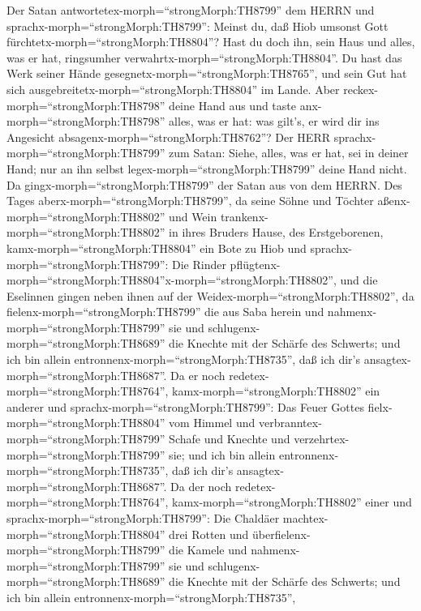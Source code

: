  Der Satan antwortetex-morph=``strongMorph:TH8799'' dem
HERRN und sprachx-morph=``strongMorph:TH8799'': Meinst du, daß Hiob
umsonst Gott fürchtetx-morph=``strongMorph:TH8804''?  Hast
du doch ihn, sein Haus und alles, was er hat, ringsumher
verwahrtx-morph=``strongMorph:TH8804''. Du hast das Werk seiner Hände
gesegnetx-morph=``strongMorph:TH8765'', und sein Gut hat sich
ausgebreitetx-morph=``strongMorph:TH8804'' im Lande.  Aber
reckex-morph=``strongMorph:TH8798'' deine Hand aus und taste
anx-morph=``strongMorph:TH8798'' alles, was er hat: was gilt's, er wird
dir ins Angesicht absagenx-morph=``strongMorph:TH8762''? 
Der HERR sprachx-morph=``strongMorph:TH8799'' zum Satan: Siehe, alles,
was er hat, sei in deiner Hand; nur an ihn selbst
legex-morph=``strongMorph:TH8799'' deine Hand nicht. Da
gingx-morph=``strongMorph:TH8799'' der Satan aus von dem HERRN.
 Des Tages aberx-morph=``strongMorph:TH8799'', da seine
Söhne und Töchter aßenx-morph=``strongMorph:TH8802'' und Wein
trankenx-morph=``strongMorph:TH8802'' in ihres Bruders Hause, des
Erstgeborenen,  kamx-morph=``strongMorph:TH8804'' ein Bote
zu Hiob und sprachx-morph=``strongMorph:TH8799'': Die Rinder
pflügtenx-morph=``strongMorph:TH8804''x-morph=``strongMorph:TH8802'',
und die Eselinnen gingen neben ihnen auf der
Weidex-morph=``strongMorph:TH8802'',  da
fielenx-morph=``strongMorph:TH8799'' die aus Saba herein und
nahmenx-morph=``strongMorph:TH8799'' sie und
schlugenx-morph=``strongMorph:TH8689'' die Knechte mit der Schärfe des
Schwerts; und ich bin allein entronnenx-morph=``strongMorph:TH8735'',
daß ich dir's ansagtex-morph=``strongMorph:TH8687''.  Da er
noch redetex-morph=``strongMorph:TH8764'',
kamx-morph=``strongMorph:TH8802'' ein anderer und
sprachx-morph=``strongMorph:TH8799'': Das Feuer Gottes
fielx-morph=``strongMorph:TH8804'' vom Himmel und
verbranntex-morph=``strongMorph:TH8799'' Schafe und Knechte und
verzehrtex-morph=``strongMorph:TH8799'' sie; und ich bin allein
entronnenx-morph=``strongMorph:TH8735'', daß ich dir's
ansagtex-morph=``strongMorph:TH8687''.  Da der noch
redetex-morph=``strongMorph:TH8764'', kamx-morph=``strongMorph:TH8802''
einer und sprachx-morph=``strongMorph:TH8799'': Die Chaldäer
machtex-morph=``strongMorph:TH8804'' drei Rotten und
überfielenx-morph=``strongMorph:TH8799'' die Kamele und
nahmenx-morph=``strongMorph:TH8799'' sie und
schlugenx-morph=``strongMorph:TH8689'' die Knechte mit der Schärfe des
Schwerts; und ich bin allein entronnenx-morph=``strongMorph:TH8735'',
